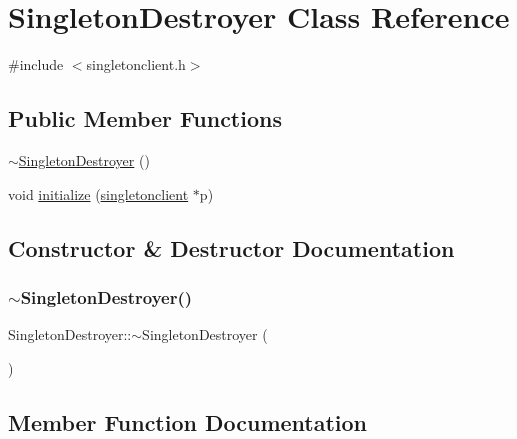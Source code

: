 \hypertarget{class_singleton_destroyer}{}\section{Singleton\+Destroyer Class Reference}
\label{class_singleton_destroyer}


{\ttfamily \#include $<$singletonclient.\+h$>$}

\subsection*{Public Member Functions}
\begin{DoxyCompactItemize}
\item 
\mbox{\hyperlink{class_singleton_destroyer_a8ac3166871f4c5411edfdb13594dee15}{$\sim$\+Singleton\+Destroyer}} ()
\item 
void \mbox{\hyperlink{class_singleton_destroyer_aeae8cd790935298bcbfde8c151f6120f}{initialize}} (\mbox{\hyperlink{classsingletonclient}{singletonclient}} $\ast$p)
\end{DoxyCompactItemize}


\subsection{Constructor \& Destructor Documentation}
\mbox{\label{class_singleton_destroyer_a8ac3166871f4c5411edfdb13594dee15}} 
\subsubsection{\texorpdfstring{$\sim$\+Singleton\+Destroyer()}{~SingletonDestroyer()}}
{\footnotesize\ttfamily Singleton\+Destroyer\+::$\sim$\+Singleton\+Destroyer (\begin{DoxyParamCaption}{ }\end{DoxyParamCaption})\hspace{0.3cm}{\ttfamily [inline]}}



\subsection{Member Function Documentation}
\mbox{\label{class_singleton_destroyer_aeae8cd790935298bcbfde8c151f6120f}} 
